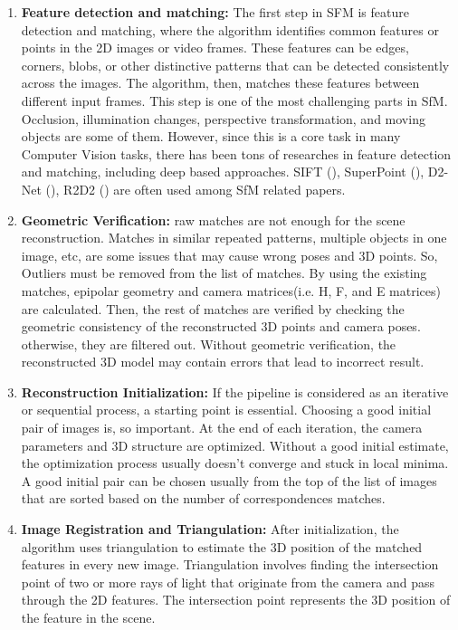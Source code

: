 \documentclass[11pt]{article}
\begin{document}
    \begin{enumerate}
        \item \textbf{Feature detection and matching:} The first step in SFM is feature detection and matching, where
        the algorithm identifies common features or points in the 2D images or video frames. These features
        can be edges, corners, blobs, or other distinctive patterns that can be detected consistently across
        the images. The algorithm, then, matches these features between different input frames. This step is one
        of the most challenging parts in SfM. Occlusion, illumination changes, perspective transformation, and moving objects
        are some of them. However, since this is a core task in many Computer Vision tasks, there has been
        tons of researches in feature detection and matching, including deep based approaches. SIFT (\cite{lowe1999object}), SuperPoint (\cite{detone2018superpoint}),
        D2-Net (\cite{dusmanu2019d2net}), R2D2 (\cite{revaud2019r2d2}) are often used among SfM related papers.

        \item \textbf{Geometric Verification:} raw matches are not enough for the scene reconstruction.
        Matches in similar repeated patterns, multiple objects in one image, etc, are some issues that may cause wrong
        poses and 3D points. So, Outliers must be removed from the list of matches. By using the existing matches,
        epipolar geometry and camera matrices(i.e. H, F, and E matrices) are calculated.
        Then, the rest of matches are verified by checking the geometric consistency of the reconstructed 3D points and
        camera poses. otherwise, they are filtered out.
        Without geometric verification, the reconstructed 3D model may contain errors that lead to incorrect result.

        \item \textbf{Reconstruction Initialization:} If the pipeline is considered as an iterative or sequential process,
        a starting point is essential. Choosing a good initial pair of images is, so important. At the end of
        each iteration, the camera parameters and 3D structure are optimized. Without a good initial estimate,
        the optimization process usually doesn't converge and stuck in local minima. A good initial pair can be
        chosen usually from the top of the list of images that are sorted based on the number of correspondences matches.

        \item \textbf{Image Registration and Triangulation:} After initialization, the algorithm uses triangulation to estimate
        the 3D position of the matched features in every new image. Triangulation involves finding the intersection point
        of two or more rays of light that originate from the camera and pass through the 2D features. The intersection
        point represents the 3D position of the feature in the scene.


\end{enumerate}
\end{document}
